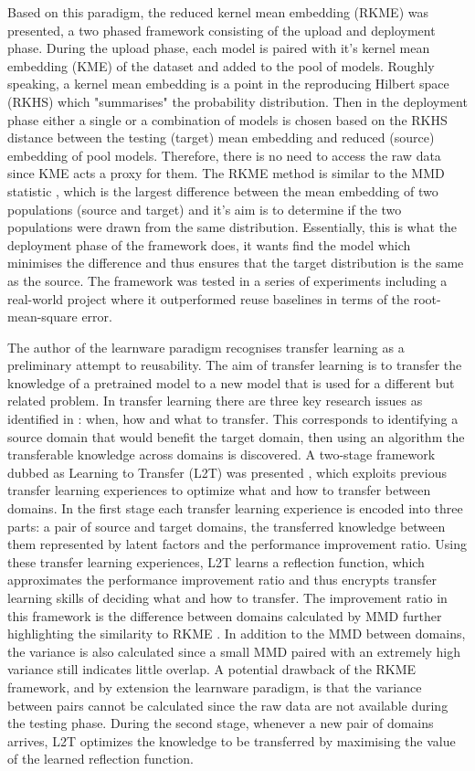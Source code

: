 \documentclass{mpaper}
\begin{document}
Based on this paradigm, the reduced kernel mean embedding (RKME) \cite{KernelMMD} was presented, a two phased framework consisting of the upload and deployment phase. During the upload phase, each model is paired with it's kernel mean embedding (KME) of the dataset and added to the pool of models. Roughly speaking, a kernel mean embedding is a point in the reproducing Hilbert space (RKHS) which "summarises" the probability distribution. Then in the deployment phase either a single or a combination of models is chosen based on the RKHS distance between the testing (target) mean embedding and reduced (source) embedding of pool models. Therefore, there is no need to access the raw data since KME acts a proxy for them. The RKME method is similar to the MMD  statistic \cite{OriginalMMD}, which is the largest difference between the mean embedding of two populations (source and target) and it's aim is to determine if the two populations were drawn from the same distribution. Essentially, this is what the deployment phase of the framework does, it wants find the model which minimises the difference and thus ensures that the target distribution is the same as the source. The framework was tested in a series of experiments including a real-world project where it outperformed reuse baselines in terms of the root-mean-square error.

The author of the learnware paradigm \cite{Learnware} recognises transfer learning as a preliminary attempt to reusability. The aim of transfer learning is to transfer the knowledge of a pretrained model to a new model that is used for a different but related problem. In transfer learning there are three key research issues as identified in \cite{DefinitionTL}: when, how and what to transfer. This corresponds to identifying a source domain that would benefit the target domain, then using an algorithm the transferable knowledge across domains is discovered. A two-stage framework dubbed as Learning to Transfer (L2T) was presented \cite{L2T}, which exploits previous transfer learning experiences to optimize what and how to transfer between domains. In the first stage each transfer learning experience is encoded into three parts: a pair of source and target domains, the transferred knowledge between them represented by latent factors and the performance improvement ratio. Using these transfer learning experiences, L2T learns a reflection function, which approximates the performance improvement ratio and thus encrypts transfer learning skills of deciding what and how to transfer. The improvement ratio in this framework is the difference between domains calculated by MMD further highlighting the similarity to RKME \cite{KernelMMD}. In addition to the MMD between domains, the variance is also calculated since a small MMD paired with an extremely high variance still indicates little overlap. A potential drawback of the RKME \cite{KernelMMD} framework, and by extension the learnware paradigm, is that the variance between pairs cannot be calculated since the raw data are not available during the testing phase. During the second stage, whenever a new pair of domains arrives, L2T optimizes the knowledge to be transferred by maximising the value of the learned reflection function.
\end{document}
